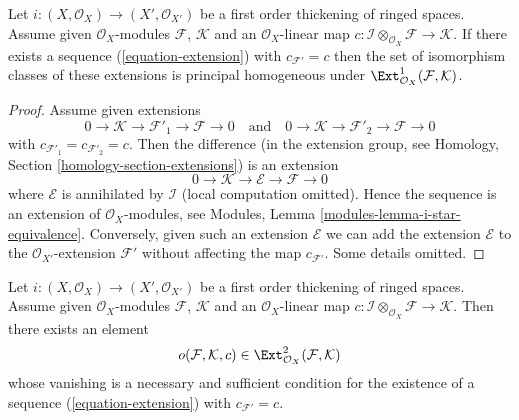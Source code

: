 \begin{lemma}
\label{lemma-inf-ext}
Let $i : (X, \mathcal{O}_X) \to (X', \mathcal{O}_{X'})$ be a first order
thickening of ringed spaces.
Assume given $\mathcal{O}_X$-modules $\mathcal{F}$, $\mathcal{K}$
and an $\mathcal{O}_X$-linear map
$c : \mathcal{I} \otimes_{\mathcal{O}_X} \mathcal{F} \to \mathcal{K}$.
If there exists a sequence (\ref{equation-extension}) with
$c_{\mathcal{F}'} = c$ then the set of isomorphism classes of these
extensions is principal homogeneous under
$\Ext^1_{\mathcal{O}_X}(\mathcal{F}, \mathcal{K})$.
\end{lemma}

\begin{proof}
Assume given extensions
$$
0 \to \mathcal{K} \to \mathcal{F}'_1 \to \mathcal{F} \to 0
\quad\text{and}\quad
0 \to \mathcal{K} \to \mathcal{F}'_2 \to \mathcal{F} \to 0
$$
with $c_{\mathcal{F}'_1} = c_{\mathcal{F}'_2} = c$. Then the difference
(in the extension group, see
Homology, Section \ref{homology-section-extensions})
is an extension
$$
0 \to \mathcal{K} \to \mathcal{E} \to \mathcal{F} \to 0
$$
where $\mathcal{E}$ is annihilated by $\mathcal{I}$ (local computation
omitted). Hence the sequence is an extension of $\mathcal{O}_X$-modules,
see Modules, Lemma \ref{modules-lemma-i-star-equivalence}.
Conversely, given such an extension $\mathcal{E}$ we can add the extension
$\mathcal{E}$ to the $\mathcal{O}_{X'}$-extension $\mathcal{F}'$ without
affecting the map $c_{\mathcal{F}'}$. Some details omitted.
\end{proof}

\begin{lemma}
\label{lemma-inf-obs-ext}
Let $i : (X, \mathcal{O}_X) \to (X', \mathcal{O}_{X'})$
be a first order thickening of ringed spaces. Assume given
$\mathcal{O}_X$-modules $\mathcal{F}$, $\mathcal{K}$
and an $\mathcal{O}_X$-linear map
$c : \mathcal{I} \otimes_{\mathcal{O}_X} \mathcal{F} \to \mathcal{K}$.
Then there exists an element
$$
o(\mathcal{F}, \mathcal{K}, c) \in
\Ext^2_{\mathcal{O}_X}(\mathcal{F}, \mathcal{K})
$$
whose vanishing is a necessary and sufficient condition for the existence
of a sequence (\ref{equation-extension}) with $c_{\mathcal{F}'} = c$.
\end{lemma}

